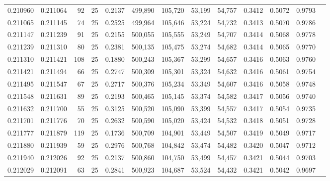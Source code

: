 \begin{tabular}{rrrrrrrrrrrrr}
0.210960 & 0.211064 &    92 &  25 &                                     0.2137 & 499,890 & 105,720 &  53,199 &  54,757 & 0.3412 & 0.5072 & 0.9793 \\
0.211065 & 0.211145 &    74 &  25 &                                     0.2525 & 499,964 & 105,646 &  53,224 &  54,732 & 0.3413 & 0.5070 & 0.9786 \\
0.211147 & 0.211239 &    91 &  25 &                                     0.2155 & 500,055 & 105,555 &  53,249 &  54,707 & 0.3414 & 0.5068 & 0.9778 \\
0.211239 & 0.211310 &    80 &  25 &                                     0.2381 & 500,135 & 105,475 &  53,274 &  54,682 & 0.3414 & 0.5065 & 0.9770 \\
0.211310 & 0.211421 &   108 &  25 &                                     0.1880 & 500,243 & 105,367 &  53,299 &  54,657 & 0.3416 & 0.5063 & 0.9760 \\
0.211421 & 0.211494 &    66 &  25 &                                     0.2747 & 500,309 & 105,301 &  53,324 &  54,632 & 0.3416 & 0.5061 & 0.9754 \\
0.211495 & 0.211547 &    67 &  25 &                                     0.2717 & 500,376 & 105,234 &  53,349 &  54,607 & 0.3416 & 0.5058 & 0.9748 \\
0.211548 & 0.211631 &    89 &  25 &                                     0.2193 & 500,465 & 105,145 &  53,374 &  54,582 & 0.3417 & 0.5056 & 0.9740 \\
0.211632 & 0.211700 &    55 &  25 &                                     0.3125 & 500,520 & 105,090 &  53,399 &  54,557 & 0.3417 & 0.5054 & 0.9735 \\
0.211701 & 0.211776 &    70 &  25 &                                     0.2632 & 500,590 & 105,020 &  53,424 &  54,532 & 0.3418 & 0.5051 & 0.9728 \\
0.211777 & 0.211879 &   119 &  25 &                                     0.1736 & 500,709 & 104,901 &  53,449 &  54,507 & 0.3419 & 0.5049 & 0.9717 \\
0.211880 & 0.211939 &    59 &  25 &                                     0.2976 & 500,768 & 104,842 &  53,474 &  54,482 & 0.3420 & 0.5047 & 0.9712 \\
0.211940 & 0.212026 &    92 &  25 &                                     0.2137 & 500,860 & 104,750 &  53,499 &  54,457 & 0.3421 & 0.5044 & 0.9703 \\
0.212029 & 0.212091 &    63 &  25 &                                     0.2841 & 500,923 & 104,687 &  53,524 &  54,432 & 0.3421 & 0.5042 & 0.9697 \\

\end{tabular}
